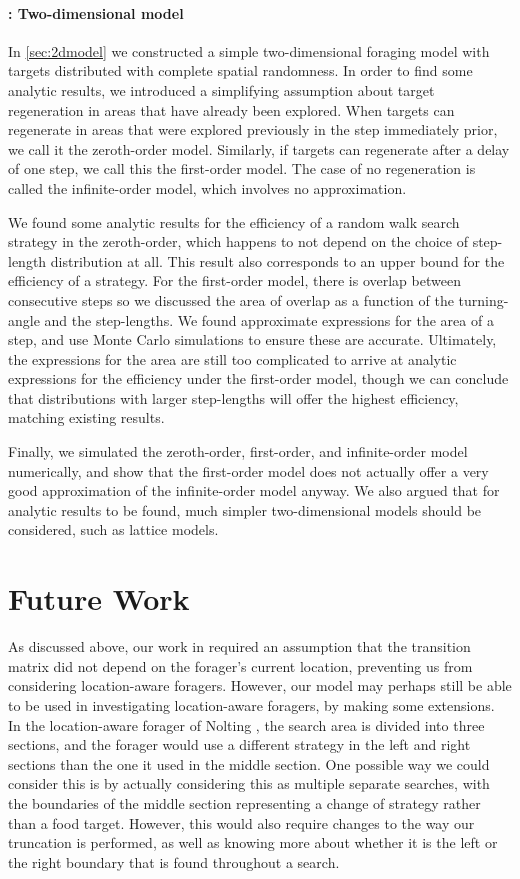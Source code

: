 \paragraph{: Two-dimensional model}
In \cref{sec:2dmodel} we constructed a simple two-dimensional foraging model with targets distributed with complete spatial randomness. In order to find some analytic results, we introduced a simplifying assumption about target regeneration in areas that have already been explored. When targets can regenerate in areas that were explored previously in the step immediately prior, we call it the zeroth-order model. Similarly, if targets can regenerate after a delay of one step, we call this the first-order model. The case of no regeneration is called the infinite-order model, which involves no approximation. 

We found some analytic results for the efficiency of a random walk search strategy in the zeroth-order, which happens to not depend on the choice of step-length distribution at all. This result also corresponds to an upper bound for the efficiency of a strategy. For the first-order model, there is overlap between consecutive steps so we discussed the area of overlap as a function of the turning-angle and the step-lengths. We found approximate expressions for the area of a step, and use Monte Carlo simulations to ensure these are accurate. Ultimately, the expressions for the area are still too complicated to arrive at analytic expressions for the efficiency under the first-order model, though we can conclude that distributions with larger step-lengths will offer the highest efficiency, matching existing results. 

Finally, we simulated the zeroth-order, first-order, and infinite-order model numerically, and show that the first-order model does not actually offer a very good approximation of the infinite-order model anyway. We also argued that for analytic results to be found, much simpler two-dimensional models should be considered, such as lattice models.

\section{Future Work}
As discussed above, our work in  required an assumption that the transition matrix did not depend on the forager's current location, preventing us from considering location-aware foragers. However, our model may perhaps still be able to be used in investigating location-aware foragers, by making some extensions. In the location-aware forager of Nolting \cite{Nolting_2013}, the search area is divided into three sections, and the forager would use a different strategy in the left and right sections than the one it used in the middle section. One possible way we could consider this is by actually considering this as multiple separate searches, with the boundaries of the middle section representing a change of strategy rather than a food target. However, this would also require changes to the way our truncation is performed, as well as knowing more about whether it is the left or the right boundary that is found throughout a search.

